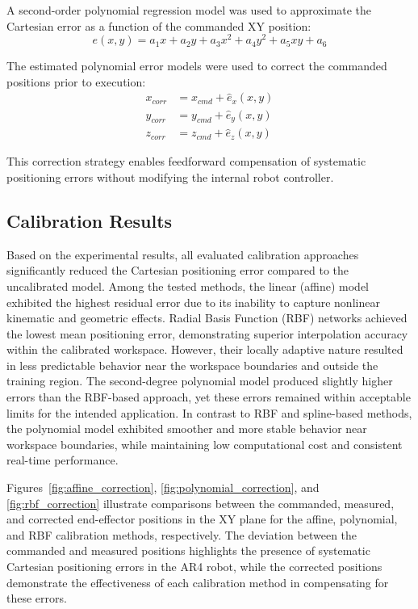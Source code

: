 A second-order polynomial regression model was used to approximate the Cartesian error as a function of the commanded XY position:
\begin{equation}
e(x,y) = a_1 x + a_2 y + a_3 x^2 + a_4 y^2 + a_5 xy + a_6
\end{equation}

The estimated polynomial error models were used to correct the commanded positions prior to execution:
\begin{equation}
\begin{aligned}
x_{corr} &= x_{cmd} + \hat{e}_x(x,y) \\
y_{corr} &= y_{cmd} + \hat{e}_y(x,y) \\
z_{corr} &= z_{cmd} + \hat{e}_z(x,y)
\end{aligned}
\end{equation}

This correction strategy enables feedforward compensation of systematic positioning errors without modifying the internal robot controller.

\subsection{Calibration Results}

Based on the experimental results, all evaluated calibration approaches significantly reduced the Cartesian positioning error compared to the uncalibrated model. Among the tested methods, the linear (affine) model exhibited the highest residual error due to its inability to capture nonlinear kinematic and geometric effects. Radial Basis Function (RBF) networks achieved the lowest mean positioning error, demonstrating superior interpolation accuracy within the calibrated workspace. However, their locally adaptive nature resulted in less predictable behavior near the workspace boundaries and outside the training region. The second-degree polynomial model produced slightly higher errors than the RBF-based approach, yet these errors remained within acceptable limits for the intended application. In contrast to RBF and spline-based methods, the polynomial model exhibited smoother and more stable behavior near workspace boundaries, while maintaining low computational cost and consistent real-time performance.

Figures~\ref{fig:affine_correction}, \ref{fig:polynomial_correction}, and \ref{fig:rbf_correction} illustrate comparisons between the commanded, measured, and corrected end-effector positions in the XY plane for the affine, polynomial, and RBF calibration methods, respectively. The deviation between the commanded and measured positions highlights the presence of systematic Cartesian positioning errors in the AR4 robot, while the corrected positions demonstrate the effectiveness of each calibration method in compensating for these errors.

